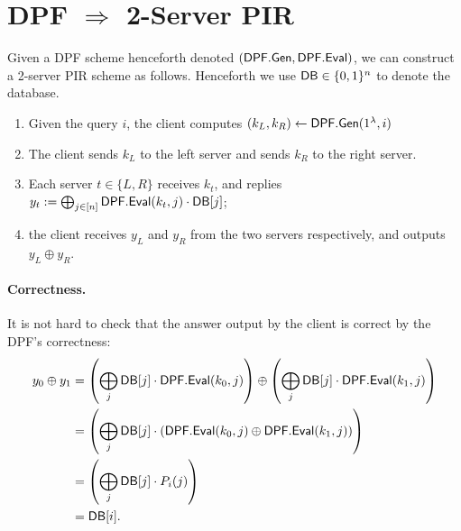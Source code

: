 \section{DPF $\Longrightarrow$ 2-Server PIR}

Given a DPF scheme henceforth denoted $({\sf DPF.Gen}, {\sf DPF.Eval})$, 
we can construct 
a 2-server PIR scheme as follows.
Henceforth we use ${\sf DB} \in \{0, 1\}^n$ 
to denote the database.


\begin{enumerate}
    \item Given the query $i$, the client 
computes $(k_L,k_R) \leftarrow {\sf DPF}.{\sf Gen}(1^\lambda, i)$
    \item The client sends %
$k_L$ to the left server and sends $k_R$ to the right server. 
    \item %
Each server $t \in \{L, R\}$ receives $k_t$, 
and replies 
$y_t := \bigoplus_{j\in [n]} {\sf DPF}.{\sf Eval}(k_t,j)\cdot {\sf DB}[j]$;
    \item the client receives
$y_L$ and $y_R$ from the two servers respectively, 
and  outputs $y_L \oplus y_R$.
\end{enumerate}

\paragraph{Correctness.} 
It is not hard to check that the answer output by the client
is correct by the DPF's correctness:  
\begin{align*} 
    y_0 \oplus y_1 & = \left(\bigoplus_{j}{\sf DB}[j]\cdot {\sf DPF.Eval}(k_0,j) \right) \oplus \left(\bigoplus_{j}\mathsf{DB}[j]\cdot {\sf DPF}.{\sf Eval}(k_1,j) \right) \\
    & = \left(\bigoplus_{j}{\sf DB}[j]\cdot ({\sf DPF.Eval}(k_0,j)\oplus {\sf DPF}.{\sf Eval}(k_1,j)) \right) \\
    & = \left(\bigoplus_{j}{\sf DB}[j]\cdot P_{i}(j)\right) \\
    & = {\sf DB}[i].
\end{align*}

